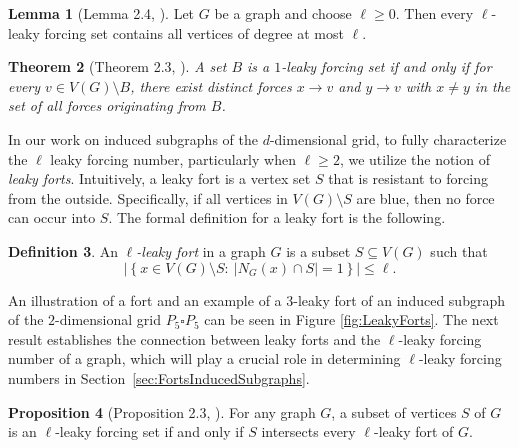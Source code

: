 \documentclass[11pt]{article}
\theoremstyle{plain} \newtheorem{question}{Question}
\newtheorem{thm}{Theorem}
\theoremstyle{definition}
\newtheorem{defn}[thm]{Definition}
\newtheorem{prop}[thm]{Proposition}
\newtheorem{lem}[thm]{Lemma}
\begin{document}
\begin{lem}[Lemma 2.4, \cite{KenterOGpaper}] \label{lem:lowdegree}
Let $G$ be a graph and choose $\ell \geq 0$. Then every $\ell$-leaky forcing set contains all vertices of degree at most $\ell$.
\end{lem}



\begin{thm}[Theorem 2.3, \cite{Reslience}]\label{prop:twoways}
A set $B$ is a $1$-leaky forcing set if and only if for every $v \in V(G)\setminus B$, there exist distinct forces $x \to v$ and $y \to v$ with $x \neq y$ in the set of all forces originating from $B$.
\end{thm}





In our work on induced subgraphs of the $d$-dimensional grid, to fully characterize the $\ell$ leaky forcing number, particularly when $\ell\ge 2$, we utilize the notion of \emph{leaky forts}. Intuitively, a leaky fort is a vertex set $S$ that is resistant to forcing from the outside. Specifically, if all vertices in $V(G)\setminus S$ are blue, then no force can occur into $S$. The formal definition for a leaky fort is the following. 

\begin{defn}\label{def:lfort}
An \emph{$\ell$-leaky fort} in a graph $G$ is a subset $S\subseteq V(G)$ such that
\[
\left|\left\{x\in V(G)\setminus S:\ \left|N_G(x)\cap S\right|=1\right\}\right|\le \ell.
\]
\end{defn}

An illustration of a fort and an example of a 3-leaky fort of an induced subgraph of the $2$-dimensional grid $P_{5} \square P_{5}$ can be seen in Figure \ref{fig:LeakyForts}. The next result establishes the connection between leaky forts and the $\ell$-leaky forcing number of a graph, which will play a crucial role in determining $\ell$-leaky forcing numbers in Section~\ref{sec:FortsInducedSubgraphs}.

\begin{prop}[Proposition 2.3, \cite{KenterOGpaper}]\label{prop:LeakyForcingSetIntersectsForts}
For any graph $G$, a subset of vertices $S$ of $G$ is an $\ell$-leaky forcing set if and only if $S$ intersects every $\ell$-leaky fort of $G$.
\end{prop}
\end{document}
